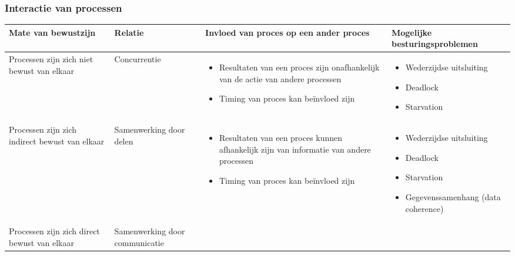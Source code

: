 \begin{landscape}

\subsubsection{Interactie van processen}

\begin{table}[htb]
    \centering
    \begin{center}
    \def\arraystretch{1.5}%
    \begin{tabular}{ | p{5cm} | p{3cm} | p{7cm} | p{6cm} |}
    \hline
    Mate van \newline bewustzijn & Relatie & Invloed van proces op een ander proces & Mogelijke besturingsproblemen \\ \hline
   Processen zijn zich niet bewust van elkaar & Concurrentie & 
   \begin{itemize}
       \item Resultaten van een proces zijn onafhankelijk van de actie van andere processen
       \item Timing van proces kan beïnvloed zijn
   \end{itemize}
   & \begin{itemize}
       \item Wederzijdse uitsluiting
       \item Deadlock
       \item Starvation
   \end{itemize} \\ \hline
   Processen zijn zich indirect bewust van elkaar & Samenwerking door delen & \begin{itemize}
       \item Resultaten van een proces kunnen afhankelijk zijn van informatie van andere processen
       \item Timing van proces kan beïnvloed zijn
   \end{itemize} & \begin{itemize}
       \item Wederzijdse uitsluiting
       \item Deadlock
       \item Starvation
       \item Gegevenssamenhang (data coherence)
   \end{itemize} \\ \hline
   Processen zijn zich direct bewust van elkaar & Samenwerking door communicatie & \begin{itemize}

\end{itemize}
\end{tabular}
\end{center}
\end{table}
\end{landscape}
